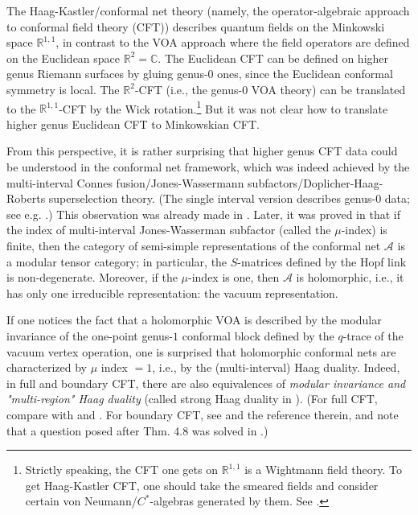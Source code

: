 \documentclass[12pt,a4paper,notitlepage]{article}
\theoremstyle{definition}
\theoremstyle{plain}
\newcommand{\mc}{\mathcal}
\newcommand{\Cbb}{\mathbb C}
\newcommand{\Rbb}{\mathbb R}
\numberwithin{equation}{subsection}
\begin{document}
The Haag-Kastler/conformal net theory (namely, the operator-algebraic approach to conformal field theory (CFT)) describes quantum fields on the Minkowski space $\Rbb^{1,1}$,  in contrast to the VOA approach where the field operators are defined on the Euclidean space $\Rbb^2=\Cbb$. The Euclidean CFT can be defined on higher genus Riemann surfaces by gluing genus-$0$ ones, since the Euclidean conformal symmetry is local.  The $\Rbb^2$-CFT (i.e., the genus-$0$ VOA theory) can be translated to the $\Rbb^{1,1}$-CFT by the Wick rotation.\footnote{Strictly speaking, the CFT one gets on $\Rbb^{1,1}$ is a Wightmann field theory. To get   Haag-Kastler CFT, one should take the smeared fields and consider certain von Neumann/$C^*$-algebras generated by them. See \cite{CKLW18}.} But it was not clear how to translate higher genus Euclidean CFT to Minkowskian CFT.


From this perspective, it is rather surprising that higher genus CFT data could be understood in the conformal net framework, which was indeed achieved by the multi-interval Connes fusion/Jones-Wassermann subfactors/Doplicher-Haag-Roberts superselection theory. (The single interval version describes genus-$0$ data; see e.g. \cite{FRS89,FRS92,Was98}.)  This observation was already made in \cite{Was94}. Later, it was proved in  \cite{KLM01,LX04} that if the index of multi-interval Jones-Wasserman subfactor (called the $\mu$-index) is finite, then the  category of semi-simple representations of the conformal net $\mc A$ is a modular tensor category; in particular, the $S$-matrices defined by the Hopf link is non-degenerate. Moreover, if the $\mu$-index is one, then $\mc A$ is holomorphic, i.e., it has only one irreducible representation: the vacuum representation.

If one notices the fact that a holomorphic VOA is described by the modular invariance of the one-point genus-$1$ conformal block defined by the $q$-trace of the vacuum vertex operation, one is surprised that holomorphic conformal nets are characterized by $\mu$ index $=1$, i.e., by the (multi-interval) Haag duality. Indeed, in full and boundary CFT, there are also equivalences of  \emph{modular invariance and "multi-region" Haag duality} (called strong Haag duality in \cite{Hen14}). (For full CFT, compare \cite[Prop. 6.6]{BKL15} with \cite[Thm. 5.7]{Kong08} and \cite[Thm. 3.4]{KR09a}. For boundary CFT, see \cite[Sec. 4]{KR09b} and the reference therein, and note that a question posed after Thm. 4.8 was solved in \cite[Prop. 4.18]{BKL15}.)
\end{document}
